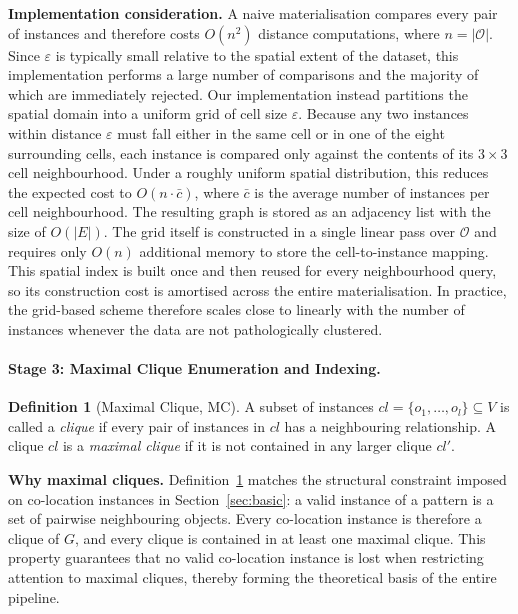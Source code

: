 \documentclass[12pt, letterpaper]{template}
\theoremstyle{definition}
\newtheorem{definition}{Definition}
\begin{document}
\noindent\textbf{Implementation consideration.}
A naive materialisation compares every pair of instances and therefore costs
$O(n^2)$ distance computations, where $n = |\mathcal{O}|$. Since $\varepsilon$ is typically
small relative to the spatial extent of the dataset, this implementation performs a large number of comparisons and the majority of which are immediately rejected. Our implementation instead
partitions the spatial domain into a uniform grid of cell size $\varepsilon$. Because any two
instances within distance $\varepsilon$ must fall either in the same cell or in one of the
eight surrounding cells, each instance is compared only against the contents of its
$3\times3$ cell neighbourhood. Under a roughly uniform spatial distribution, this reduces the
expected cost to $O(n \cdot \bar{c})$, where $\bar{c}$ is the average number of instances per
cell neighbourhood. The resulting graph is stored as an adjacency list with the size of $O(|E|)$.
The grid itself is constructed in a single linear pass over $\mathcal{O}$ and requires only
$O(n)$ additional memory to store the cell-to-instance mapping. This spatial index is built once
and then reused for every neighbourhood query, so its construction cost is amortised across the
entire materialisation. In practice, the grid-based scheme therefore scales close to linearly with
the number of instances whenever the data are not pathologically clustered.

\paragraph{Stage 3: Maximal Clique Enumeration and Indexing.}
\label{subsec:mcr_mce}

\begin{definition}[Maximal Clique, MC]
\label{def:mc}
A subset of instances $cl = \{o_1, \ldots, o_l\} \subseteq V$ is called a \emph{clique} if
every pair of instances in $cl$ has a neighbouring relationship. A clique $cl$ is a
\emph{maximal clique} if it is not contained in any larger clique $cl'$.
\end{definition}

\noindent\textbf{Why maximal cliques.}
Definition~\ref{def:mc} matches the structural constraint imposed on co-location instances in
Section~\ref{sec:basic}: a valid instance of a pattern is a set of pairwise neighbouring
objects. Every co-location instance is therefore a clique of $G$, and every clique is
contained in at least one maximal clique. This property guarantees that no valid co-location instance is lost when restricting attention to maximal cliques, thereby forming the theoretical basis of the entire pipeline.
\end{document}
